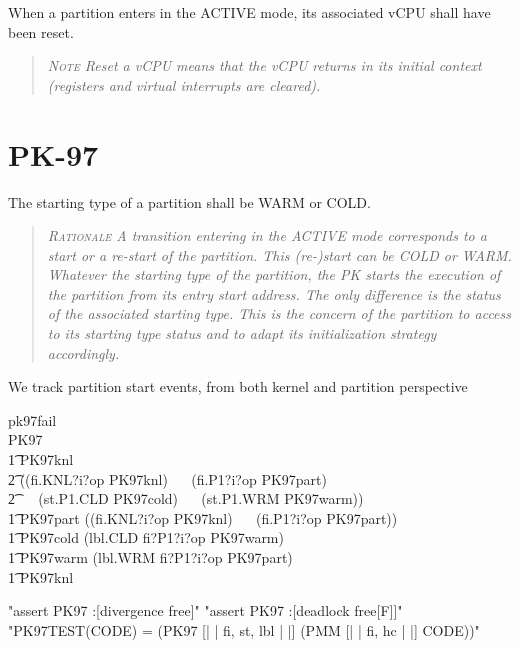 When a partition enters in the ACTIVE mode,  its associated vCPU shall have been reset.
\begin{quote}\it
\textsc{Note}
Reset a vCPU means that the vCPU returns in its initial context (registers and virtual interrupts are cleared).
\end{quote}


\section{PK-97}

The starting type of a partition shall be WARM or COLD.
\begin{quote}\it
\textsc{Rationale}
A transition entering in the ACTIVE mode corresponds to
a start or a re-start of the partition.
This (re-)start can be COLD or WARM.
Whatever the starting type of the partition,
the PK starts the execution of the partition from its entry start address.
The only difference is the status of the associated starting type.
This is the concern of the partition to access to its starting type status
and to adapt its initialization strategy accordingly.
\end{quote}


 We track partition start events, from both kernel and partition perspective

\begin{circus}
\circchannel pk97fail\\

\circprocess PK97 \circdef \circbegin\\

 \t1 PK97knl \circdef \\
  \t2 ((fi.KNL?i?op \then PK97knl)  %
     ~\extchoice~ (fi.P1?i?op \then PK97part) \\ %
  \t2   ~\extchoice~ (st.P1.CLD \then PK97cold)
     ~\extchoice~ (st.P1.WRM \then PK97warm))\\

 \t1 PK97part \circdef ((fi.KNL?i?op \then PK97knl)  %
     ~\extchoice~ (fi.P1?i?op \then PK97part))\\  %

 \t1 PK97cold \circdef (lbl.CLD \then fi?P1?i?op \then PK97warm)\\ %

 \t1 PK97warm \circdef (lbl.WRM \then fi?P1?i?op \then PK97part)\\ %

  \t1 \circspot PK97knl\\ %
  \circend
\end{circus}
\begin{assert}
"assert PK97 :[divergence free]"
\also "assert PK97 :[deadlock free[F]]"
\also "PK97TEST(CODE) = (PK97 [| {| fi, st, lbl |} |] (PMM [| {| fi, hc |} |] CODE))"
\end{assert}
